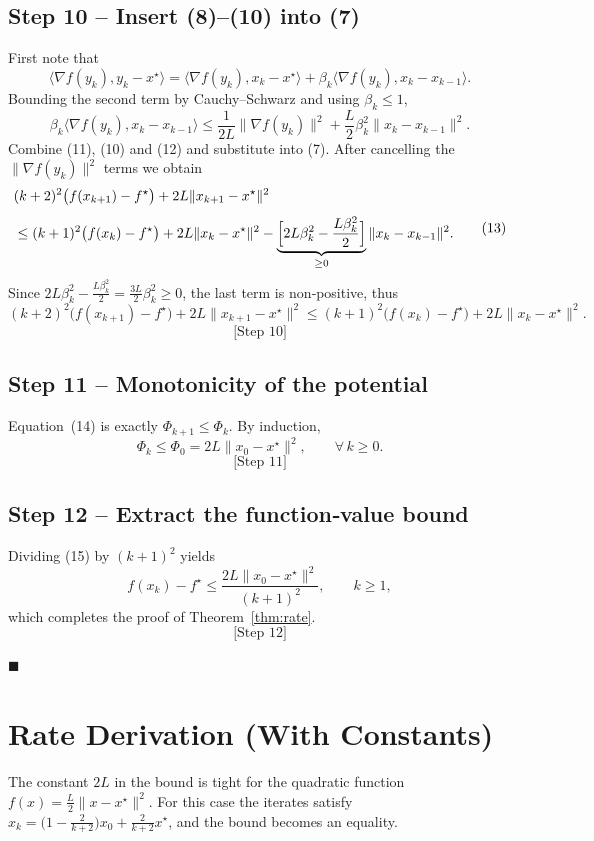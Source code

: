 \documentclass{article}
\begin{document}
\subsection*{Step 10 – Insert (8)–(10) into (7)}
First note that
\[
\langle\nabla f(y_{k}),y_{k}-x^{\star}\rangle
 =\langle\nabla f(y_{k}),x_{k}-x^{\star}\rangle
   +\beta_{k}\langle\nabla f(y_{k}),x_{k}-x_{k-1}\rangle .
\tag{11}
\]
Bounding the second term by Cauchy–Schwarz and using $\beta_{k}\le1$,
\[
\beta_{k}\langle\nabla f(y_{k}),x_{k}-x_{k-1}\rangle
\le\frac{1}{2L}\|\nabla f(y_{k})\|^{2}
    +\frac{L}{2}\beta_{k}^{2}\|x_{k}-x_{k-1}\|^{2}.
\tag{12}
\]
Combine (11), (10) and (12) and substitute into (7). After cancelling the $\|\nabla f(y_{k})\|^{2}$ terms we obtain
\[
\begin{aligned}
&(k+2)^{2}\bigl(f(x_{k+1})-f^{\star}\bigr)
   +2L\|x_{k+1}-x^{\star}\|^{2}\\[4pt]
&\le (k+1)^{2}\bigl(f(x_{k})-f^{\star}\bigr)
   +2L\|x_{k}-x^{\star}\|^{2}
   -\underbrace{\Bigl[2L\beta_{k}^{2}-\frac{L\beta_{k}^{2}}{2}\Bigr]}_{\ge 0}
        \|x_{k}-x_{k-1}\|^{2}.
\end{aligned}
\tag{13}
\]
Since $2L\beta_{k}^{2}-\frac{L\beta_{k}^{2}}{2}= \frac{3L}{2}\beta_{k}^{2}\ge0$, the last term is non‑positive, thus
\[
(k+2)^{2}\bigl(f(x_{k+1})-f^{\star}\bigr)
   +2L\|x_{k+1}-x^{\star}\|^{2}
\le (k+1)^{2}\bigl(f(x_{k})-f^{\star}\bigr)
   +2L\|x_{k}-x^{\star}\|^{2}.
\tag{14}
\]
\[
\text{[Step 10]}
\]

\subsection*{Step 11 – Monotonicity of the potential}
Equation~(14) is exactly $\Phi_{k+1}\le\Phi_{k}$. By induction,
\[
\Phi_{k}\le\Phi_{0}=2L\|x_{0}-x^{\star}\|^{2},
\qquad\forall\,k\ge0.
\tag{15}
\]
\[
\text{[Step 11]}
\]

\subsection*{Step 12 – Extract the function‑value bound}
Dividing (15) by $(k+1)^{2}$ yields
\[
f(x_{k})-f^{\star}\le\frac{2L\|x_{0}-x^{\star}\|^{2}}{(k+1)^{2}},
\qquad k\ge1,
\]
which completes the proof of Theorem~\ref{thm:rate}.
\[
\text{[Step 12]}
\]

\hfill $\blacksquare$

\section*{Rate Derivation (With Constants)}
The constant $2L$ in the bound is tight for the quadratic function $f(x)=\frac{L}{2}\|x-x^{\star}\|^{2}$. For this case the iterates satisfy $x_{k}= \bigl(1-\frac{2}{k+2}\bigr)x_{0}+ \frac{2}{k+2}x^{\star}$, and the bound becomes an equality.
\end{document}
